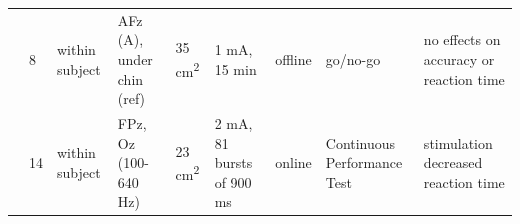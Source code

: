 \documentclass[11pt,]{memoir}
\begin{document}
\begin{longtable}[]{@{}lllllllll@{}}
\begin{minipage}[t]{0.08\columnwidth}\raggedright
\textcite{Miller2015}\strut
\end{minipage} & \begin{minipage}[t]{0.02\columnwidth}\raggedright
8\strut
\end{minipage} & \begin{minipage}[t]{0.04\columnwidth}\raggedright
within
subject\strut
\end{minipage} & \begin{minipage}[t]{0.13\columnwidth}\raggedright
AFz (A), under chin (ref)\strut
\end{minipage} & \begin{minipage}[t]{0.03\columnwidth}\raggedright
35
cm\textsuperscript{2}\strut
\end{minipage} & \begin{minipage}[t]{0.05\columnwidth}\raggedright
1 mA, 15
min\strut
\end{minipage} & \begin{minipage}[t]{0.06\columnwidth}\raggedright
offline\strut
\end{minipage} & \begin{minipage}[t]{0.11\columnwidth}\raggedright
go/no-go\strut
\end{minipage} & \begin{minipage}[t]{0.24\columnwidth}\raggedright
no effects on accuracy or reaction time\strut
\end{minipage}\tabularnewline
\begin{minipage}[t]{0.08\columnwidth}\raggedright
\textcite{Mauri2015}\strut
\end{minipage} & \begin{minipage}[t]{0.02\columnwidth}\raggedright
14\strut
\end{minipage} & \begin{minipage}[t]{0.04\columnwidth}\raggedright
within
subject\strut
\end{minipage} & \begin{minipage}[t]{0.13\columnwidth}\raggedright
FPz, Oz (100-640 Hz)\strut
\end{minipage} & \begin{minipage}[t]{0.03\columnwidth}\raggedright
23
cm\textsuperscript{2}\strut
\end{minipage} & \begin{minipage}[t]{0.05\columnwidth}\raggedright
2 mA, 81
bursts of
900 ms\strut
\end{minipage} & \begin{minipage}[t]{0.06\columnwidth}\raggedright
online\strut
\end{minipage} & \begin{minipage}[t]{0.11\columnwidth}\raggedright
Continuous Performance
Test\strut
\end{minipage} & \begin{minipage}[t]{0.24\columnwidth}\raggedright
stimulation decreased reaction time\strut
\end{minipage}\tabularnewline
\bottomrule
\end{longtable}
\end{document}
